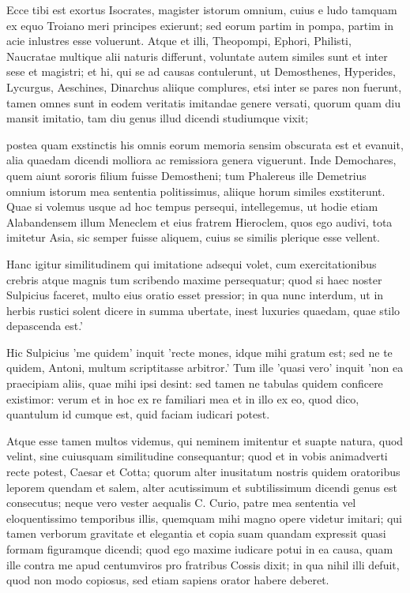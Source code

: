  Ecce tibi est exortus Isocrates, magister istorum omnium, cuius e ludo tamquam ex equo Troiano meri principes exierunt; sed eorum partim in pompa, partim in acie inlustres esse voluerunt. Atque et illi, Theopompi, Ephori, Philisti, Naucratae multique alii naturis differunt, voluntate autem similes sunt et inter sese et magistri; et hi, qui se ad causas contulerunt, ut Demosthenes, Hyperides, Lycurgus, Aeschines, Dinarchus aliique complures, etsi inter se pares non fuerunt, tamen omnes sunt in eodem veritatis imitandae genere versati, quorum quam diu mansit imitatio, tam diu genus illud dicendi studiumque vixit;

 postea quam exstinctis his omnis eorum memoria sensim obscurata est et evanuit, alia quaedam dicendi molliora ac remissiora genera viguerunt. Inde Demochares, quem aiunt sororis filium fuisse Demostheni; tum Phalereus ille Demetrius omnium istorum mea sententia politissimus, aliique horum similes exstiterunt. Quae si volemus usque ad hoc tempus persequi, intellegemus, ut hodie etiam Alabandensem illum Meneclem et eius fratrem Hieroclem, quos ego audivi, tota imitetur Asia, sic semper fuisse aliquem, cuius se similis plerique esse vellent.

 Hanc igitur similitudinem qui imitatione adsequi volet, cum exercitationibus crebris atque magnis tum scribendo maxime persequatur; quod si haec noster Sulpicius faceret, multo eius oratio esset pressior; in qua nunc interdum, ut in herbis rustici solent dicere in summa ubertate, inest luxuries quaedam, quae stilo depascenda est.'

 Hic Sulpicius 'me quidem' inquit 'recte mones, idque mihi gratum est; sed ne te quidem, Antoni, multum scriptitasse arbitror.' Tum ille 'quasi vero' inquit 'non ea praecipiam aliis, quae mihi ipsi desint: sed tamen ne tabulas quidem conficere existimor: verum et in hoc ex re familiari mea et in illo ex eo, quod dico, quantulum id cumque est, quid faciam iudicari potest.

 Atque esse tamen multos videmus, qui neminem imitentur et suapte natura, quod velint, sine cuiusquam similitudine consequantur; quod et in vobis animadverti recte potest, Caesar et Cotta; quorum alter inusitatum nostris quidem oratoribus leporem quendam et salem, alter acutissimum et subtilissimum dicendi genus est consecutus; neque vero vester aequalis C. Curio, patre mea sententia vel eloquentissimo temporibus illis, quemquam mihi magno opere videtur imitari; qui tamen verborum gravitate et elegantia et copia suam quandam expressit quasi formam figuramque dicendi; quod ego maxime iudicare potui in ea causa, quam ille contra me apud centumviros pro fratribus Cossis dixit; in qua nihil illi defuit, quod non modo copiosus, sed etiam sapiens orator habere deberet.

